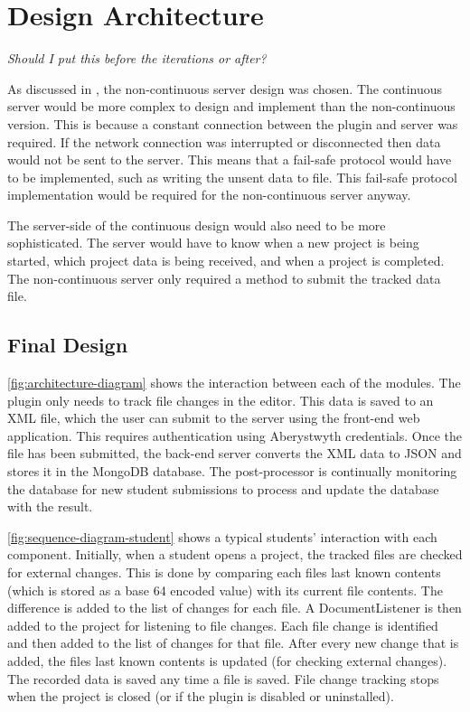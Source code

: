 \chapter{Design Architecture}
\textit{Should I put this before the iterations or after?}

As discussed in , the non-continuous server design was chosen. The continuous server would be more complex to design and implement than the non-continuous version. This is because a constant connection between the plugin and server was required. If the network connection was interrupted or disconnected then data would not be sent to the server. This means that a fail-safe protocol would have to be implemented, such as writing the unsent data to file. This fail-safe protocol implementation would be required for the non-continuous server anyway.

The server-side of the continuous design would also need to be more sophisticated. The server would have to know when a new project is being started, which project data is being received, and when a project is completed. The non-continuous server only required a method to submit the tracked data file.

\section{Final Design}
\autoref{fig:architecture-diagram} shows the interaction between each of the modules. The plugin only needs to track file changes in the editor. This data is saved to an XML file, which the user can submit to the server using the front-end web application. This requires authentication using Aberystwyth credentials. Once the file has been submitted, the back-end server converts the XML data to JSON and stores it in the MongoDB database. The post-processor is continually monitoring the database for new student submissions to process and update the database with the result.

\autoref{fig:sequence-diagram-student} shows a typical students' interaction with each component. Initially, when a student opens a project, the tracked files are checked for external changes. This is done by comparing each files last known contents (which is stored as a base 64 encoded value) with its current file contents. The difference is added to the list of changes for each file. A DocumentListener is then added to the project for listening to file changes. Each file change is identified and then added to the list of changes for that file. After every new change that is added, the files last known contents is updated (for checking external changes). The recorded data is saved any time a file is saved. File change tracking stops when the project is closed (or if the plugin is disabled or uninstalled).

